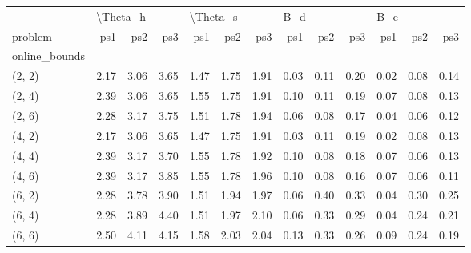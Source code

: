 \begin{tabular}{lrrrrrrrrrrrr}
\toprule
{} & \multicolumn{3}{l}{\textbackslash Theta\_h} & \multicolumn{3}{l}{\textbackslash Theta\_s} & \multicolumn{3}{l}{B\_d} & \multicolumn{3}{l}{B\_e} \\
problem &      ps1 &  ps2 &  ps3 &      ps1 &  ps2 &  ps3 &  ps1 &  ps2 &  ps3 &  ps1 &  ps2 &  ps3 \\
online\_bounds &          &      &      &          &      &      &      &      &      &      &      &      \\
\midrule
(2, 2)        &     2.17 & 3.06 & 3.65 &     1.47 & 1.75 & 1.91 & 0.03 & 0.11 & 0.20 & 0.02 & 0.08 & 0.14 \\
(2, 4)        &     2.39 & 3.06 & 3.65 &     1.55 & 1.75 & 1.91 & 0.10 & 0.11 & 0.19 & 0.07 & 0.08 & 0.13 \\
(2, 6)        &     2.28 & 3.17 & 3.75 &     1.51 & 1.78 & 1.94 & 0.06 & 0.08 & 0.17 & 0.04 & 0.06 & 0.12 \\
(4, 2)        &     2.17 & 3.06 & 3.65 &     1.47 & 1.75 & 1.91 & 0.03 & 0.11 & 0.19 & 0.02 & 0.08 & 0.13 \\
(4, 4)        &     2.39 & 3.17 & 3.70 &     1.55 & 1.78 & 1.92 & 0.10 & 0.08 & 0.18 & 0.07 & 0.06 & 0.13 \\
(4, 6)        &     2.39 & 3.17 & 3.85 &     1.55 & 1.78 & 1.96 & 0.10 & 0.08 & 0.16 & 0.07 & 0.06 & 0.11 \\
(6, 2)        &     2.28 & 3.78 & 3.90 &     1.51 & 1.94 & 1.97 & 0.06 & 0.40 & 0.33 & 0.04 & 0.30 & 0.25 \\
(6, 4)        &     2.28 & 3.89 & 4.40 &     1.51 & 1.97 & 2.10 & 0.06 & 0.33 & 0.29 & 0.04 & 0.24 & 0.21 \\
(6, 6)        &     2.50 & 4.11 & 4.15 &     1.58 & 2.03 & 2.04 & 0.13 & 0.33 & 0.26 & 0.09 & 0.24 & 0.19 \\
\bottomrule
\end{tabular}
